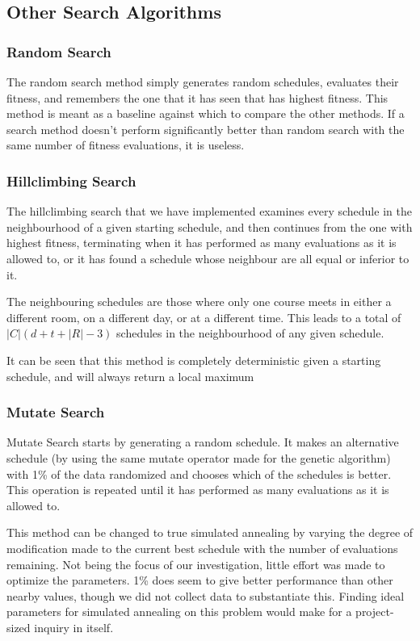\documentclass[letterpaper]{article}
\begin{document}
  \subsection{Other Search Algorithms}
    \subsubsection{Random Search}
      The random search method simply generates random schedules, evaluates their fitness,
      and remembers the one that it has seen that has highest fitness. This method is meant
      as a baseline against which to compare the other methods. If a search method doesn't
      perform significantly better than random search with the same number of fitness
      evaluations, it is useless.
      
    \subsubsection{Hillclimbing Search}
      The hillclimbing search that we have implemented examines every schedule in the
      neighbourhood of a given starting schedule, and then continues from the one with
      highest fitness, terminating when it has performed as many evaluations as it is allowed
      to, or it has found a schedule whose neighbour are all equal or inferior to it.
      
      The neighbouring schedules are those where only one course meets in either a different
      room, on a different day, or at a different time. This leads to a total of
      $ |C|(d+t+|R|-3) $ schedules in the neighbourhood of any given schedule.
      
      It can be seen that this method is completely deterministic given a starting schedule,
      and will always return a local maximum

    \subsubsection{Mutate Search}
      Mutate Search starts by generating a random schedule. It makes an alternative schedule
      (by using the same mutate operator made for the genetic algorithm) with 1\% of the
      data randomized and chooses which of the schedules is better. This operation is
      repeated until it has performed as many evaluations as it is allowed to.
      
      This method can be changed to true simulated annealing by varying the degree of
      modification made to the current best schedule with the number of evaluations
      remaining. Not being the focus of our investigation, little effort was made to 
      optimize the parameters. 1\% does seem to give better performance than other nearby 
      values, though we did not collect data to substantiate this. Finding ideal parameters 
      for simulated annealing on this problem would make for a project-sized inquiry in itself.
\end{document}
